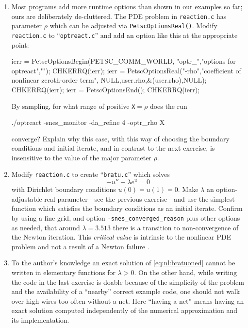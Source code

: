 \begin{enumerate}
\item Most \PETSc programs add more runtime options than shown in our examples so far; ours are deliberately de-cluttered.  The PDE problem in \texttt{reaction.c} has parameter $\rho$ which can be adjusted via \texttt{PetscOptionsReal()}.  Modify \texttt{reaction.c} to ``\texttt{optreact.c}'' and add an option like this at the appropriate point:
\begin{code}
  ierr = PetscOptionsBegin(PETSC_COMM_WORLD,
                           "optr_","options for optreact",""); CHKERRQ(ierr);
  ierr = PetscOptionsReal("-rho","coefficient of nonlinear zeroth-order term",
                          NULL,user.rho,&(user.rho),NULL); CHKERRQ(ierr);
  ierr = PetscOptionsEnd(); CHKERRQ(ierr);
\end{code}
By sampling, for what range of positive \texttt{X}$=\rho$ does the run
\begin{cline}
./optreact -snes_monitor -da_refine 4 -optr_rho X
\end{cline}
converge?  Explain why this case, with this way of choosing the boundary conditions and initial iterate, and in contrast to the next exercise, is insensitive to the value of the major parameter $\rho$.

\item \label{exer:nl:bratu} Modify \texttt{reaction.c} to create ``\texttt{bratu.c}'' which solves
\begin{equation}
    - u'' - \lambda e^u = 0 \label{eq:nl:bratuoned}
\end{equation}
with Dirichlet boundary conditions $u(0)=u(1)=0$.  Make $\lambda$ an option-adjustable real parameter---see the previous exercise---and use the simplest function which satisfies the boundary conditions as an initial iterate.  Confirm by using a fine grid, and option \texttt{-snes\_converged\_reason} plus other options as needed, that around $\lambda=3.513$ there is a transition to non-convergence of the Newton iteration.  This \emph{critical value} is intrinsic to the nonlinear PDE problem and not a result of a Newton failure \citep{Doedeletal1991}.

\item To the author's knowledge an exact solution of \eqref{eq:nl:bratuoned} cannot be written in elementary functions for $\lambda>0$.  On the other hand, while writing the code in the last exercise is doable because of the simplicity of the problem and the availability of a ``nearby'' correct example code, one should not walk over high wires too often without a net.  Here ``having a net'' means having an exact solution computed independently of the numerical approximation and its implementation.


\end{enumerate}

